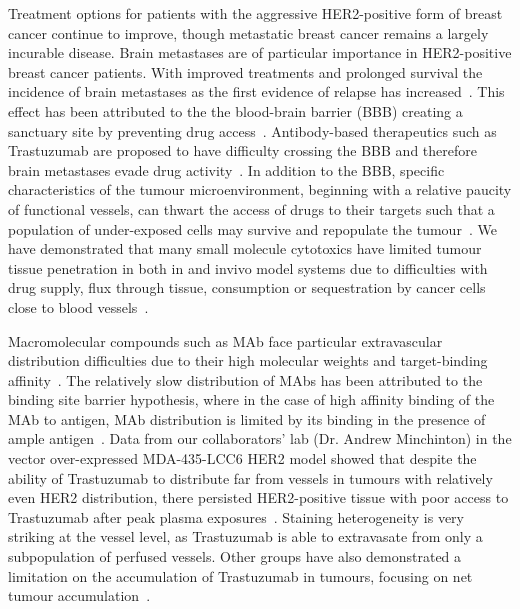 Treatment options for patients with the aggressive \acs{HER2}-positive form of breast cancer continue to improve, though metastatic breast cancer remains a largely incurable disease.
Brain metastases are of particular importance in \acs{HER2}-positive breast cancer patients.
With improved treatments and prolonged survival the incidence of brain metastases as the first evidence of relapse has increased~\cite{Seal:2012cn,Bria:2007gc}.
This effect has been attributed to the the blood-brain barrier (\acs{BBB}) creating a sanctuary site by preventing drug access~\cite{Kaplan:2014es,Lai:2004bd}.
Antibody-based therapeutics such as Trastuzumab are proposed to have difficulty crossing the \acs{BBB} and therefore brain metastases evade drug activity~\cite{Seal:2012cn,Murrell:2015bz,Stemmler:2006}.
In addition to the \acs{BBB}, specific characteristics of the tumour microenvironment, beginning with a relative paucity of functional vessels, can thwart the access of drugs to their targets such that a population of under-exposed cells may survive and repopulate the tumour~\cite{Minchinton:2006gs}.
We have demonstrated that many small molecule cytotoxics have limited tumour tissue penetration in both in and in\added{-}vivo model systems due to difficulties with drug supply, flux through tissue, consumption or sequestration by cancer cells close to blood vessels~\cite{Kyle:2014cy,Kyle:2007ch,Huxham:2004hm,Kyle:2004fo,Kyle:1999kr}.

Macromolecular compounds such as \acs{MAb} face particular extravascular distribution difficulties due to their high molecular weights and target-binding affinity~\cite{Jain:2010ie,Chauhan:2011fi}.
The relatively slow distribution of \acs{MAb}s has been attributed to the binding site barrier hypothesis, where in the case of high affinity binding of the \acs{MAb} to antigen, \acs{MAb} distribution is limited by its binding in the presence of ample antigen~\cite{Juweid:1992ty}.
Data from our collaborators' lab (Dr. Andrew Minchinton) in the vector over-expressed MDA-435-LCC6 \acs{HER2} model showed that despite the ability of Trastuzumab to distribute far from vessels in tumours with relatively even \acs{HER2} distribution, there persisted \acs{HER2}-positive tissue with poor access to Trastuzumab after peak plasma exposures~\cite{Baker:2008ci}.
Staining heterogeneity is very striking at the vessel level, as Trastuzumab is able to extravasate from only a subpopulation of perfused vessels.
Other groups have also demonstrated a limitation on the accumulation of Trastuzumab in tumours, focusing on net tumour accumulation~\cite{Jain:2010ie,Chauhan:2011fi,Lee:2010gb}.


